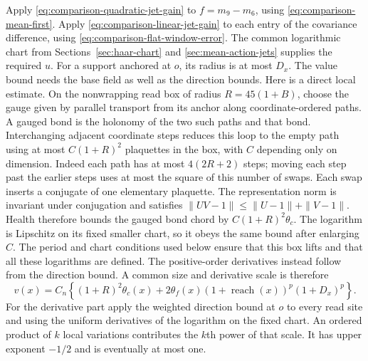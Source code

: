 Apply \eqref{eq:comparison-quadratic-jet-gain} to
$f=m_9-m_6$, using \eqref{eq:comparison-mean-first}.
Apply \eqref{eq:comparison-linear-jet-gain} to each entry of
the covariance difference, using
\eqref{eq:comparison-flat-window-error}. The common logarithmic
chart from Sections~\ref{sec:haar-chart} and
\ref{sec:mean-action-jets} supplies the required $u$.
For a support anchored at $o$, its radius is at most $D_x$.
The value bound needs the base field as well as the direction bounds.
Here is a direct local estimate. On the nonwrapping read box of radius
$R=45(1+B)$, choose the gauge given by parallel transport from its
anchor along coordinate-ordered paths. A gauged bond is the holonomy
of the two such paths and that bond. Interchanging adjacent coordinate
steps reduces this loop to the empty path using at most
$C(1+R)^2$ plaquettes in the box, with $C$ depending only on dimension.
Indeed each path has at most $4(2R+2)$ steps; moving each step past
the earlier steps uses at most the square of this number of swaps.
Each swap inserts a conjugate of one elementary plaquette.
The representation norm is invariant under conjugation and satisfies
$\|UV-1\|\le\|U-1\|+\|V-1\|$. Health therefore bounds the gauged
bond chord by $C(1+R)^2\theta_c$. The logarithm is Lipschitz on its
fixed smaller chart, so it obeys the same bound after enlarging $C$.
The period and chart conditions used below ensure that this box lifts
and that all these logarithms are defined.
The positive-order derivatives instead follow from the direction
bound. A common size and derivative scale is therefore
\[
 v(x)=C_n\left\{(1+R)^2\theta_c(x)+
 2\theta_f(x)(1+\operatorname{reach}(x))^p(1+D_x)^p\right\}.
\]
For the derivative part apply the weighted direction bound at $o$
to every read site and using the uniform derivatives of the
logarithm on the fixed chart. An ordered product of $k$ local
variations contributes the $k$th power of that scale.
It has upper exponent $-1/2$ and is eventually at most one.

